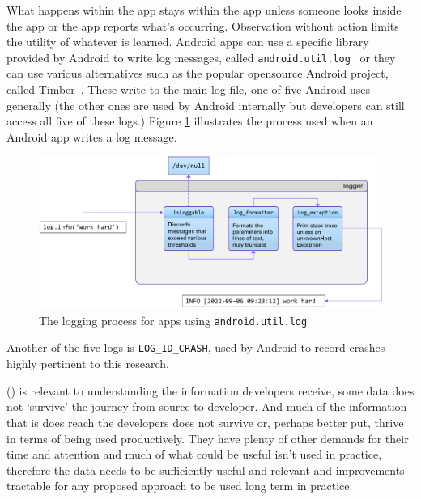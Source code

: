 What happens within the app stays within the app unless someone looks inside the app or the app reports what's occurring. Observation without action limits the utility of whatever is learned.  Android apps can use a specific library provided by Android to write log messages, called \texttt{android.util.log}~ or they can use various alternatives such as the popular opensource Android project, called Timber~. These write to the main log file, one of five Android uses generally (the other ones are used by Android internally but developers can still access all five of these logs.) Figure \ref{fig:android-logging-process-for-apps.pdf} illustrates the process used when an Android app writes a log message.

\begin{figure}
    \centering
    \includegraphics[width=\linewidth]{images/my/android-logging-process-for-apps.pdf}
    \caption{The logging process for apps using \texttt{android.util.log}}
    \label{fig:android-logging-process-for-apps.pdf}
\end{figure}

Another of the five logs is \texttt{LOG\_ID\_CRASH}, used by Android to record crashes - highly pertinent to this research.~


 () is relevant to understanding the information developers receive, some data does not `survive' the journey from source to developer. And much of the information that is does reach the developers does not survive or, perhaps better put, thrive in terms of being used productively. They have plenty of other demands for their time and attention and much of what could be useful isn't used in practice, therefore the data needs to be sufficiently useful and relevant and improvements tractable for any proposed approach to be used long term in practice.

